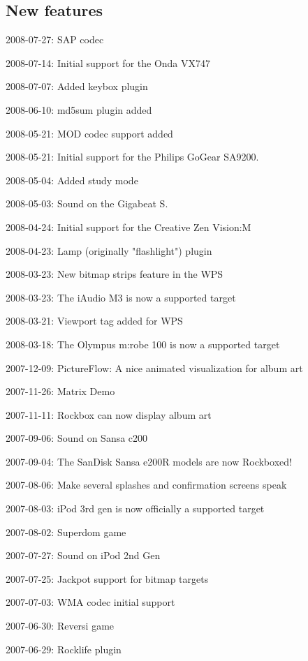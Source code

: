 \subsection{New features}
\begin{changelog}
\item 2008-07-27: SAP codec
\item 2008-07-14: Initial support for the Onda VX747
\item 2008-07-07: Added keybox plugin
\item 2008-06-10: md5sum plugin added
\item 2008-05-21: MOD codec support added
\item 2008-05-21: Initial support for the Philips GoGear SA9200.  
\item 2008-05-04: Added study mode
\item 2008-05-03: Sound on the Gigabeat S.
\item 2008-04-24: Initial support for the Creative Zen Vision:M
\item 2008-04-23: Lamp (originally "flashlight") plugin
\item 2008-03-23: New bitmap strips feature in the WPS
\item 2008-03-23: The iAudio M3 is now a supported target
\item 2008-03-21: Viewport tag added for WPS
\item 2008-03-18: The Olympus m:robe 100 is now a supported target
\item 2007-12-09: PictureFlow: A nice animated visualization for album art
\item 2007-11-26: Matrix Demo
\item 2007-11-11: Rockbox can now display album art
\item 2007-09-06: Sound on Sansa c200
\item 2007-09-04: The SanDisk Sansa e200R models are now Rockboxed!
\item 2007-08-06: Make several splashes and confirmation screens speak
\item 2007-08-03: iPod 3rd gen is now officially a supported target 
\item 2007-08-02: Superdom game
\item 2007-07-27: Sound on iPod 2nd Gen
\item 2007-07-25: Jackpot support for bitmap targets
\item 2007-07-03: WMA codec initial support
\item 2007-06-30: Reversi game
\item 2007-06-29: Rocklife plugin

\end{changelog}
